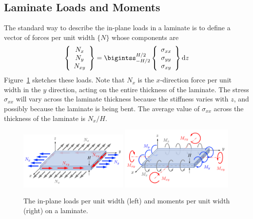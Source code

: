 \documentclass[11pt]{article}
\begin{document}
\subsection*{Laminate Loads and Moments}

The standard way to describe the in-plane loads in a laminate is to define a vector of forces per unit width $\{ N \}$ whose components are
\begin{equation}
   \left\{ \begin{array}{c}
     N_x \\ N_y \\ N_{xy}
   \end{array} \right\}
   = \bigintss_{-H/2}^{H/2} 
    \left\{ \begin{array}{c}
           \sigma_{xx}  \\  \sigma_{yy}  \\   \sigma_{xy}
           \end{array} \right\}
      \ud z
  \label{Ndef}
\end{equation}
Figure~\ref{Nfig} sketches these loads.  
Note that $N_x$ is the $x$-direction force per unit width in the $y$ direction, acting on the entire thickness of the laminate.  The stress $\sigma_{xx}$ will vary across the laminate thickness because the stiffness varies with $z$, and possibly because the laminate is being bent.  The average value of $\sigma_{xx}$ across the thickness of the laminate is $N_x / H$.  

\begin{figure}[tb]
  \centering
   \includegraphics[width = 0.48\textwidth, trim = 10  00 10 10, clip = true, keepaspectratio = true]{Nlaminate.png}
   \includegraphics[width = 0.50\textwidth, trim = 10  15 10 10, clip = true, keepaspectratio = true]{Mlaminate.png}
   \caption{The in-plane loads per unit width (left) and moments per unit width (right) on a laminate.}
   \label{Nfig}
\end{figure}
\end{document}
